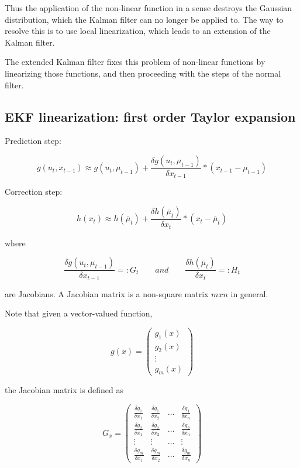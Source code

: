 \documentclass[a4paper]{article}
\begin{document}
Thus the application of the non-linear function in a sense destroys the Gaussian distribution, which the Kalman filter can no longer be applied to. The way to resolve this is to use local linearization, which leads to an extension of the Kalman filter.

The extended Kalman filter fixes this problem of non-linear functions by linearizing those functions, and then proceeding with the steps of the normal filter.

\subsection{EKF linearization: first order Taylor expansion}

Prediction step:

\begin{equation*}
    g(u_t, x_{t-1}) \approx g(u_t, \mu_{t-1}) + \frac {\delta g(u_t, \mu_{t-1})} {\delta x_{t-1}} * (x_{t-1} - \mu_{t-1})
\end{equation*}

Correction step:

\begin{equation*}
    h(x_t) \approx h(\overline{\mu}_t) + \frac {\delta h(\overline{\mu}_t)} {\delta x_t} * (x_t - \overline{\mu}_t)
\end{equation*}

where

\begin{equation*}
    \frac {\delta g(u_t, \mu_{t-1})} {\delta x_{t-1}} =: G_t
    \qquad
    and
    \qquad
    \frac {\delta h(\overline{\mu}_t)} {\delta x_t} =: H_t
\end{equation*}

are Jacobians. A Jacobian matrix is a non-square matrix $mxn$ in general.

Note that given a vector-valued function,

\begin{equation*}
    g(x) = 
    \begin{pmatrix}
    g_1(x) \\ g_2(x) \\ \vdots \\ g_m(x)
    \end{pmatrix}
\end{equation*}

the Jacobian matrix is defined as

\begin{equation*}
    G_x = 
    \begin{pmatrix}
    \frac{\delta g_1}{\delta x_1} & \frac{\delta g_1}{\delta x_2} & \ldots & \frac{\delta g_1}{\delta x_n}
    \\ 
    \frac{\delta g_2}{\delta x_1} & \frac{\delta g_2}{\delta x_2} & \ldots & \frac{\delta g_2}{\delta x_n}
    \\
    \vdots & \vdots & \ldots & \vdots
    \\
    \frac{\delta g_m}{\delta x_1} & \frac{\delta g_m}{\delta x_2} & \ldots & \frac{\delta g_m}{\delta x_n}
    \end{pmatrix}
\end{equation*}
\end{document}
